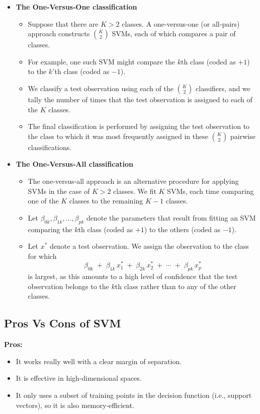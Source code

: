 \documentclass{article}
\begin{document}
\begin{itemize}
  \item \textbf{The One‐Versus‐One classification}
    \begin{itemize}
      \item Suppose that there are \(K > 2\) classes. A one‐versus‐one (or all‐pairs) approach constructs \(\binom{K}{2}\) SVMs, each of which compares a pair of classes.
      \item For example, one such SVM might compare the \(k\)th class (coded as \(+1\)) to the \(k'\)th class (coded as \(-1\)).
      \item We classify a test observation using each of the \(\binom{K}{2}\) classifiers, and we tally the number of times that the test observation is assigned to each of the \(K\) classes.
      \item The final classification is performed by assigning the test observation to the class to which it was most frequently assigned in these \(\binom{K}{2}\) pairwise classifications.
    \end{itemize}
    \item \textbf{The One‐Versus‐All classification}
    \begin{itemize}
        \item The one‐versus‐all approach is an alternative procedure for applying SVMs in the case of \(K > 2\) classes. We fit \(K\) SVMs, each time comparing one of the \(K\) classes to the remaining \(K-1\) classes.
        \item Let \(\beta_{0k}, \beta_{1k}, \dots, \beta_{pk}\) denote the parameters that result from fitting an SVM comparing the \(k\)th class (coded as \(+1\)) to the others (coded as \(-1\)).
        \item Let \(x^*\) denote a test observation. We assign the observation to the class for which
        \[
        \beta_{0k} \;+\; \beta_{1k}\,x^*_1 \;+\; \beta_{2k}\,x^*_2 \;+\; \cdots \;+\; \beta_{pk}\,x^*_p
        \]
    is largest, as this amounts to a high level of confidence that the test observation belongs to the \(k\)th class rather than to any of the other classes.
    \end{itemize}
\end{itemize}

\subsection{Pros Vs Cons of SVM}

\textbf{Pros:}
\begin{itemize}
  \item It works really well with a clear margin of separation.
  \item It is effective in high‐dimensional spaces.
  \item It only uses a subset of training points in the decision function (i.e., support vectors), so it is also memory‐efficient.
\end{itemize}
\end{document}
